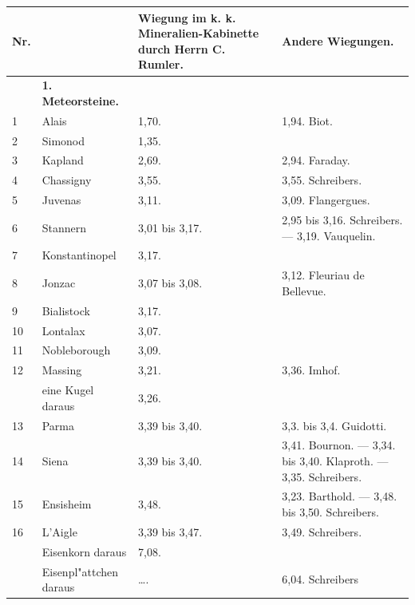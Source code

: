 \documentclass[a4paper, 11pt, oneside, polutonikogreek, german]{article}
\begin{document}
\section{}
\begin{center}
    \footnotesize
    \begin{longtable}{|p{7mm}|p{32mm}|p{30mm}|p{30mm}|}
    \hline
        Nr. & ~  & Wiegung im k. k. Mineralien-Kabinette durch Herrn C. Rumler. & Andere Wiegungen. \\ \hline
         ~ & \textbf{1. Meteorsteine.} & ~  & ~  \\ \hline
        1 & Alais & 1,70. & 1,94. Biot. \\ \hline
        2 & Simonod & 1,35. &   \\ \hline
        3 & Kapland & 2,69. & 2,94. Faraday. \\ \hline
        4 & Chassigny & 3,55. & 3,55. Schreibers. \\ \hline
        5 & Juvenas & 3,11. & 3,09. Flangergues. \\ \hline
        6 & Stannern & 3,01 bis 3,17. & 2,95 bis 3,16. Schreibers. --- 3,19. Vauquelin. \\ \hline
        7 & Konstantinopel & 3,17. &   \\ \hline
        8 & Jonzac & 3,07 bis 3,08. & 3,12. Fleuriau de Bellevue. \\ \hline
        9 & Bialistock & 3,17. &   \\ \hline
        10 & Lontalax & 3,07. &   \\ \hline
        11 & Nobleborough & 3,09. &   \\ \hline
        12 & Massing & 3,21. & 3,36. Imhof. \\ \hline
          & eine Kugel daraus & 3,26. &   \\ \hline
        13 & Parma & 3,39 bis 3,40. & 3,3. bis 3,4. Guidotti. \\ \hline
        14 & Siena & 3,39 bis 3,40. & 3,41. Bournon. --- 3,34. bis 3,40. Klaproth. --- 3,35. Schreibers. \\ \hline
        15 & Ensisheim & 3,48. & 3,23. Barthold. --- 3,48. bis 3,50. Schreibers. \\ \hline
        16 & L’Aigle & 3,39 bis 3,47. & 3,49. Schreibers. \\ \hline
          & Eisenkorn daraus & 7,08. &   \\ \hline
          & Eisenpl"attchen daraus & …. & 6,04. Schreibers \\ \hline

\end{longtable}
\end{center}
\end{document}
